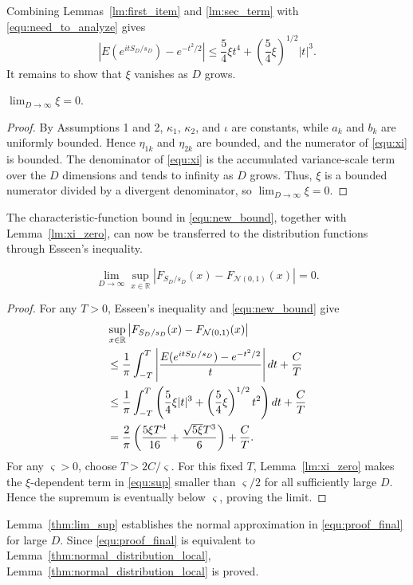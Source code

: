 Combining Lemmas~\ref{lm:first_item} and \ref{lm:sec_term} with \eqref{equ:need_to_analyze} gives
\begin{equation}
\left|E(e^{itS_D/s_D})-e^{-t^2/2}\right|
\leq
\frac{5}{4}\xi t^4+\left(\frac{5}{4}\xi\right)^{1/2}|t|^3 .
\label{equ:new_bound}
\end{equation}
It remains to show that $\xi$ vanishes as $D$ grows.
\begin{lemma}[Vanishing of $\xi$]\label{lm:xi_zero}
$\lim_{D\to\infty}\xi=0$.
\begin{proof}
By Assumptions 1 and 2, $\kappa_1$, $\kappa_2$, and $\iota$ are constants, while $a_k$ and $b_k$ are uniformly bounded. Hence $\eta_{1k}$ and $\eta_{2k}$ are bounded, and the numerator of \eqref{equ:xi} is bounded. The denominator of \eqref{equ:xi} is the accumulated variance-scale term over the $D$ dimensions and tends to infinity as $D$ grows. Thus, $\xi$ is a bounded numerator divided by a divergent denominator, so $\lim_{D\to\infty}\xi=0$.
\end{proof}
\end{lemma}
The characteristic-function bound in \eqref{equ:new_bound}, together with Lemma~\ref{lm:xi_zero}, can now be transferred to the distribution functions through Esseen's inequality.
\begin{lemma}\label{thm:lim_sup}
\[
\lim_{D\to\infty}\sup_{x\in\mathbb{R}}
\left|F_{S_D/s_D}(x)-F_{\mathcal{N}(0,1)}(x)\right|=0 .
\]
\end{lemma}
\begin{proof}
For any $T>0$, Esseen's inequality and \eqref{equ:new_bound} give
\begin{align}
&\sup_{x\in\mathbb{R}}
\left|F_{S_D/s_D}(x)-F_{\mathcal{N}(0,1)}(x)\right| \notag\\
&\leq
\frac{1}{\pi}\int_{-T}^{T}
\left|\frac{E(e^{itS_D/s_D})-e^{-t^2/2}}{t}\right|dt
+\frac{C}{T} \notag\\
&\leq
\frac{1}{\pi}\int_{-T}^{T}
\left(\frac{5}{4}\xi |t|^3
+\left(\frac{5}{4}\xi\right)^{1/2}t^2\right)dt
+\frac{C}{T} \notag\\
&=
\frac{2}{\pi}\left(
\frac{5\xi T^4}{16}
+\frac{\sqrt{5\xi}T^3}{6}\right)
+\frac{C}{T}.
\label{equ:sup}
\end{align}
For any $\varsigma>0$, choose $T>2C/\varsigma$. For this fixed $T$, Lemma~\ref{lm:xi_zero} makes the $\xi$-dependent term in \eqref{equ:sup} smaller than $\varsigma/2$ for all sufficiently large $D$. Hence the supremum is eventually below $\varsigma$, proving the limit.
\end{proof}
Lemma~\ref{thm:lim_sup} establishes the normal approximation in \eqref{equ:proof_final} for large $D$. Since \eqref{equ:proof_final} is equivalent to Lemma~\ref{thm:normal_distribution_local}, Lemma~\ref{thm:normal_distribution_local} is proved.

